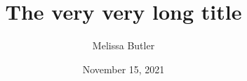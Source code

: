 \documentclass{beamer}
\title[Short title]{The very very long title}
\author[Melissa Butler]{Melissa Butler}
\institute[UWyo]{University of Wyoming}
\date{November 15, 2021}
\begin{document}
\begin{frame}
\maketitle
\end{frame}


\end{document}
